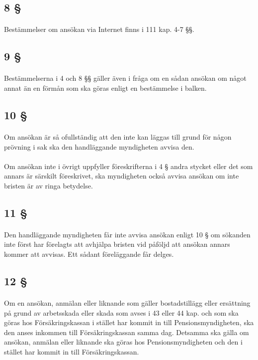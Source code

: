 \documentclass[a4paper,notitlepage,openany,10pt]{book}
\begin{document}
\subsection*{8 §}
\paragraph*{}
Bestämmelser om ansökan via Internet finns i 111 kap. 4-7 §§.
\subsection*{9 §}
\paragraph*{}
Bestämmelserna i 4 och 8 §§ gäller även i fråga om en sådan ansökan om något annat än en förmån som ska göras enligt en bestämmelse i balken.
\subsection*{10 §}
\paragraph*{}
Om ansökan är så ofullständig att den inte kan läggas till grund för någon prövning i sak ska den handläggande myndigheten avvisa den.
\paragraph*{}
Om ansökan inte i övrigt uppfyller föreskrifterna i 4 § andra stycket eller det som annars är särskilt föreskrivet, ska myndigheten också avvisa ansökan om inte bristen är av ringa betydelse.
\subsection*{11 §}
\paragraph*{}
Den handläggande myndigheten får inte avvisa ansökan enligt 10 § om sökanden inte först har förelagts att avhjälpa bristen vid påföljd att ansökan annars kommer att avvisas.
Ett sådant föreläggande får delges.
\subsection*{12 §}
\paragraph*{}
Om en ansökan, anmälan eller liknande som gäller bostadstillägg eller ersättning på grund av arbetsskada eller skada som avses i 43 eller 44 kap. och som ska göras hos Försäkringskassan i stället har kommit in till Pensionsmyndigheten, ska den anses inkommen till Försäkringskassan samma dag. Detsamma ska gälla om ansökan, anmälan eller liknande ska göras hos Pensionsmyndigheten och den i stället har kommit in till Försäkringskassan.
\end{document}
